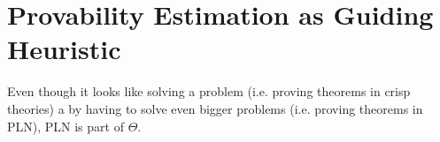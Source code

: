 \documentclass{easychair}
\begin{document}
\section{Provability Estimation as Guiding Heuristic}




Even though it looks like solving a problem (i.e. proving theorems in
crisp theories) a by having to solve even bigger problems
(i.e. proving theorems in PLN), PLN is part of $\Theta$.

\newpage



\label{sect:bib}
%
%
%


\newpage


\appendix

\end{document}
